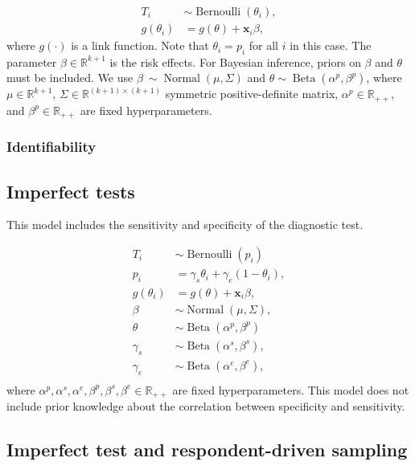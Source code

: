 \documentclass[a4paper, notitlepage, 11pt]{article}
\newcommand{\R}{\mathbb{R}}
\newcommand{\x}{\boldsymbol{x}}
\newcommand{\N}{\operatorname{Normal}}
\newcommand{\betadist}{\operatorname{Beta}}
\theoremstyle{definition}
\theoremstyle{remark}
\begin{document}
\begin{equation}
  \begin{aligned}
    T_i &\sim \operatorname{Bernoulli}(\theta_i), \\
    g(\theta_i) &= g(\theta) + \x_i\beta, 
  \end{aligned}  
\end{equation}
where $g(\cdot)$ is a link function. Note that $\theta_i = p_i$ for all $i$ in this case.
The parameter $\beta \in \R^{k+1}$ is the risk effects. For Bayesian inference, priors on
$\beta$ and $\theta$ must be included. We use $\beta ~ \sim \N(\mu, \Sigma)$
and $\theta \sim \betadist(\alpha^{p}, \beta^p)$, where $\mu
\in \R^{k+1}$, $\Sigma \in \R^{(k+1)\times(k+1)}$ symmetric positive-definite matrix,
$\alpha^p \in \R_{++}$, and $\beta^p \in \R_{++}$
are fixed hyperparameters. 

\subsubsection{Identifiability}

\subsection{Imperfect tests}

This model includes the sensitivity and specificity of the diagnostic test. 

\begin{equation}
  \begin{aligned}
    T_i &\sim \operatorname{Bernoulli}(p_i) \\
    p_i &= \gamma_s\theta_i + \gamma_e(1 - \theta_i),  \\
    g(\theta_i) &= g(\theta) + \x_i\beta,  \\
    \beta &\sim \N(\mu, \Sigma), \\ 
    \theta &\sim \betadist(\alpha^p, \beta^p) \\
    \gamma_s &\sim \betadist(\alpha^s, \beta^s), \\
    \gamma_e &\sim \betadist(\alpha^e, \beta^e), \\    
  \end{aligned}  
\end{equation}
where $\alpha^p, \alpha^s, \alpha^e, \beta^p, \beta^s, \beta^e \in \R_{++}$ are fixed hyperparameters.
This model does not include prior knowledge about the correlation between
specificity and sensitivity. 

\subsection{Imperfect test and respondent-driven sampling}
\end{document}
